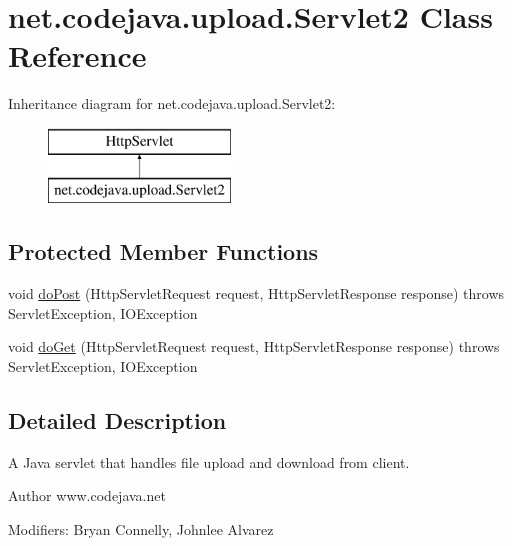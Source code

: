 \hypertarget{classnet_1_1codejava_1_1upload_1_1_servlet2}{\section{net.\+codejava.\+upload.\+Servlet2 Class Reference}
\label{classnet_1_1codejava_1_1upload_1_1_servlet2}
}
Inheritance diagram for net.\+codejava.\+upload.\+Servlet2\+:\begin{figure}[H]
\begin{center}
\leavevmode
\includegraphics[height=2.000000cm]{classnet_1_1codejava_1_1upload_1_1_servlet2}
\end{center}
\end{figure}
\subsection*{Protected Member Functions}
\begin{DoxyCompactItemize}
\item 
void \hyperlink{classnet_1_1codejava_1_1upload_1_1_servlet2_a0af557e85b8bd04e4be725302794ea77}{do\+Post} (Http\+Servlet\+Request request, Http\+Servlet\+Response response)  throws Servlet\+Exception, I\+O\+Exception 
\item 
void \hyperlink{classnet_1_1codejava_1_1upload_1_1_servlet2_aba2b87d7d7e1a8824ee7f9b6544dd5f7}{do\+Get} (Http\+Servlet\+Request request, Http\+Servlet\+Response response)  throws Servlet\+Exception, I\+O\+Exception 
\end{DoxyCompactItemize}


\subsection{Detailed Description}
A Java servlet that handles file upload and download from client. \begin{DoxyAuthor}{Author}
www.\+codejava.\+net 

 Modifiers\+: Bryan Connelly, Johnlee Alvarez 

 
\end{DoxyAuthor}


